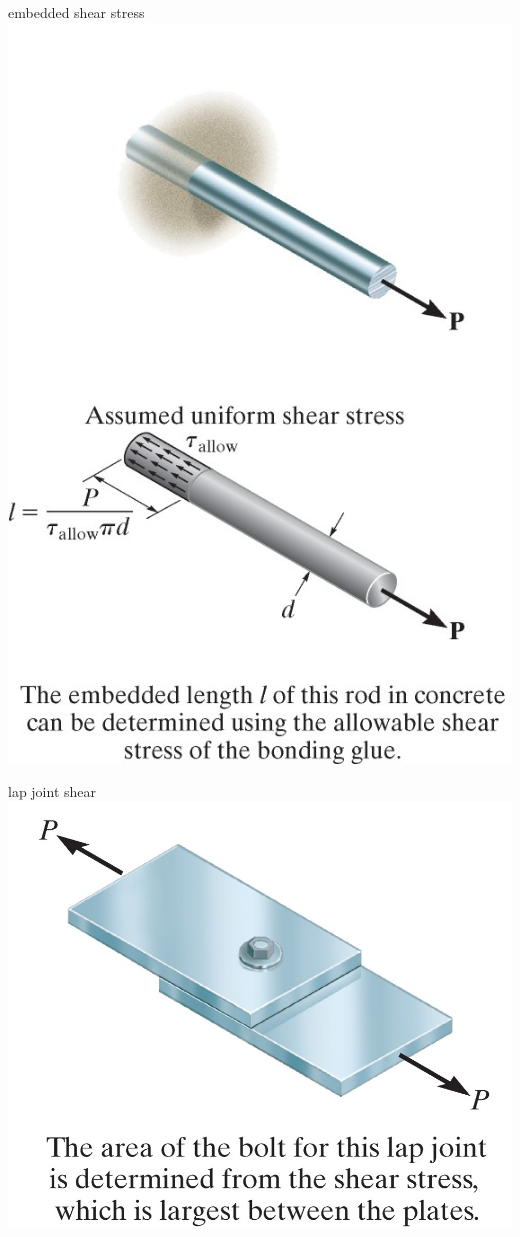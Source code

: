 \documentclass[
  letterpaper,
  ignorenonframetext,
  aspectratio=43,
  handout,
  12pt]{beamer}
\let\Oldincludegraphics\includegraphics
\renewcommand{\includegraphics}[2][]{\Oldincludegraphics[width=\textwidth,height=0.7\textheight,keepaspectratio]{#2}}
\begin{document}
\begin{frame}{embedded shear stress}
\protect\hypertarget{embedded-shear-stress}{}
\includegraphics{../images/embedded-shear.jpg}
\end{frame}

\begin{frame}{lap joint shear}
\protect\hypertarget{lap-joint-shear}{}
\includegraphics{../images/lap-shear.jpg}
\end{frame}
\end{document}
